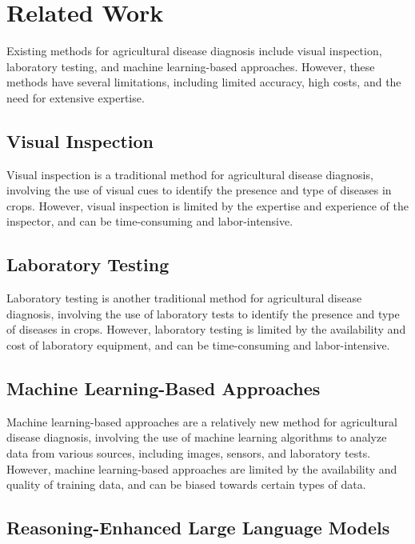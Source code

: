 \documentclass{article}
\begin{document}
\section{Related Work}

Existing methods for agricultural disease diagnosis include visual inspection, laboratory testing, and machine learning-based approaches. However, these methods have several limitations, including limited accuracy, high costs, and the need for extensive expertise.

\subsection{Visual Inspection}

Visual inspection is a traditional method for agricultural disease diagnosis, involving the use of visual cues to identify the presence and type of diseases in crops. However, visual inspection is limited by the expertise and experience of the inspector, and can be time-consuming and labor-intensive.

\subsection{Laboratory Testing}

Laboratory testing is another traditional method for agricultural disease diagnosis, involving the use of laboratory tests to identify the presence and type of diseases in crops. However, laboratory testing is limited by the availability and cost of laboratory equipment, and can be time-consuming and labor-intensive.

\subsection{Machine Learning-Based Approaches}

Machine learning-based approaches are a relatively new method for agricultural disease diagnosis, involving the use of machine learning algorithms to analyze data from various sources, including images, sensors, and laboratory tests. However, machine learning-based approaches are limited by the availability and quality of training data, and can be biased towards certain types of data.

\subsection{Reasoning-Enhanced Large Language Models}
\end{document}
